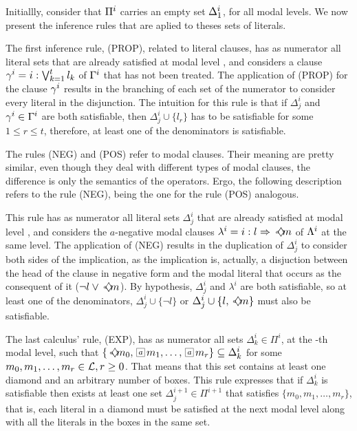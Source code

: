Initiallly, consider that $\Pi^\ml$ carries an empty set $\Delta_1^\ml$, for all
modal levels. We now present the inference rules that are aplied to theses sets
of literals.

The first inference rule, (PROP), related to literal clauses, has as numerator
all literal sets that are already satisfied at modal level \ml, and considers a
clause $\gamma^\ml = \cprop{t}{k}$ of $\Gamma^\ml$ that has not been treated. The
application of (PROP) for the clause $\gamma^\ml$ results in the branching of
each set of the numerator to consider every literal in the disjunction.  The
intuition for this rule is that if $\Delta^i_j$ and $\gamma^\ml \in \Gamma^\ml$
are both satisfiable, then $\Delta^i_j \cup \{l_r\}$ has to be satisfiable for
some $1 \leq r \leq t$, therefore, at least one of the denominators is
satisfiable.

The rules (NEG) and (POS) refer to modal clauses. Their meaning are pretty
similar, even though they deal with different types of modal clauses, the
difference is only the semantics of the operators. Ergo, the following
description refers to the rule (NEG), being the one for the rule (POS)
analogous.

This rule has as numerator all literal sets $\Delta^i_j$ that are already
satisfied at modal level \ml, and considers the $a$-negative modal clauses
$\lambda^i = \cneg$ of $\Lambda^\ml$ at the same level. The application of (NEG)
results in the duplication of $\Delta^i_j$ to consider both sides of the
implication, as the implication is, actually, a disjuction between the head of the
clause in negative form and the modal literal that occurs as the consequent
of it ($\neg l \lor\pos{a} m$). By hypothesis, $\Delta^i_j$ and $\lambda^i$ are
both satisfiable, so at least one of the denominators, $\Delta^i_j \cup \{\neg
l\}$ or $\Delta^i_j \cup \{l,\pos{a}m\}$ must also be satisfiable.

The last calculus' rule, (EXP), has as numerator all sets $\Delta^i_k \in
\Pi^i$, at the \ml-th modal level, such that $\{\pos{a}m_0, \nec{a}m_1, \ldots,
\nec{a}m_r\} \subseteq \Delta^i_k$ for some $m_0, m_1, \ldots, m_r \in
\Literals, r \geq 0$. That means that this set contains at least one diamond and
an arbitrary number of boxes.  This rule expresses that if $\Delta^i_k$ is
satisfiable then exists at least one set $\Delta^{i+1}_j \in \Pi^{i+1}$ that
satisfies $\{m_0, m_1, \ldots, m_r\}$, that is, each literal in a diamond must
be satisfied at the next modal level along with all the literals in the boxes in
the same set.

